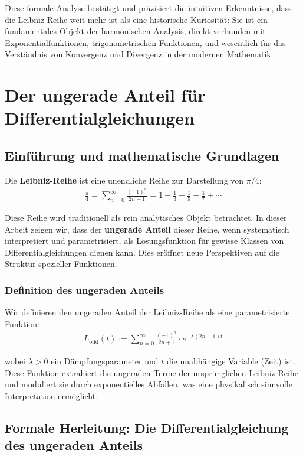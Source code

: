 \documentclass[a4paper,12pt,twoside]{report}
\theoremstyle{definition}
\begin{document}
Diese formale Analyse bestätigt und präzisiert die intuitiven Erkenntnisse, dass die Leibniz-Reihe weit mehr ist als eine historische Kuriosität: Sie ist ein fundamentales Objekt der harmonischen Analysis, direkt verbunden mit Exponentialfunktionen, trigonometrischen Funktionen, und wesentlich für das Verständnis von Konvergenz und Divergenz in der modernen Mathematik.

\section{Der ungerade Anteil für Differentialgleichungen}

\subsection{Einführung und mathematische Grundlagen}

Die \textbf{Leibniz-Reihe} ist eine unendliche Reihe zur Darstellung von $\pi/4$:
\begin{align}
	\frac{\pi}{4} = \sum_{n=0}^{\infty} \frac{(-1)^n}{2n+1} = 1 - \frac{1}{3} + \frac{1}{5} - \frac{1}{7} + \cdots
\end{align}

Diese Reihe wird traditionell als rein analytisches Objekt betrachtet. In dieser Arbeit zeigen wir, dass der \textbf{ungerade Anteil} dieser Reihe, wenn systematisch interpretiert und parametrisiert, als Lösungsfunktion für gewisse Klassen von Differentialgleichungen dienen kann. Dies eröffnet neue Perspektiven auf die Struktur spezieller Funktionen.

\subsubsection*{Definition des ungeraden Anteils}

Wir definieren den ungeraden Anteil der Leibniz-Reihe als eine parametrisierte Funktion:
\begin{align}
	L_{\text{odd}}(t) := \sum_{n=0}^{\infty} \frac{(-1)^n}{2n+1} \cdot e^{-\lambda(2n+1)t}
\end{align}

wobei $\lambda > 0$ ein Dämpfungsparameter und $t$ die unabhängige Variable (Zeit) ist. Diese Funktion extrahiert die ungeraden Terme der ursprünglichen Leibniz-Reihe und moduliert sie durch exponentielles Abfallen, was eine physikalisch sinnvolle Interpretation ermöglicht.

\subsection{Formale Herleitung: Die Differentialgleichung des ungeraden Anteils}
\end{document}
